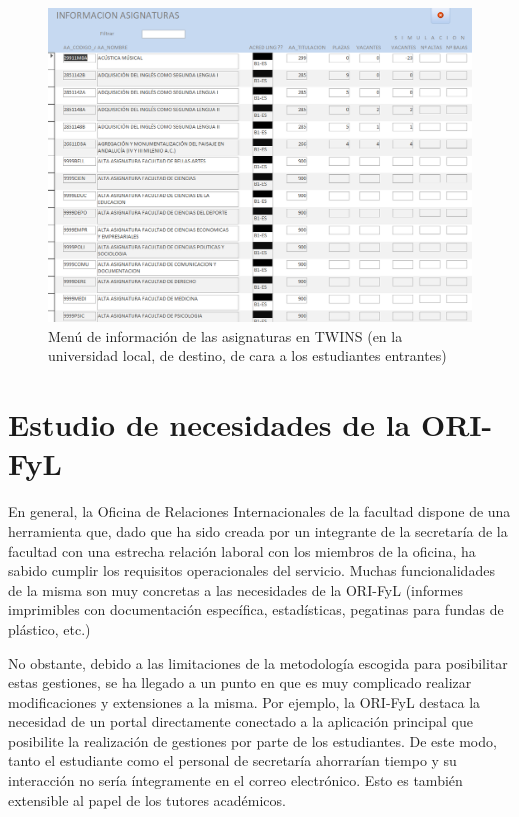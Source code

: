 \begin{figure}
	\includegraphics[width=\textwidth]{img/Capturas de TWINS/infoAsignaturas.png}
	\caption[Vista de información de asignaturas en TWINS]{Menú de información de las asignaturas en TWINS (en la universidad local, de destino, de cara a los estudiantes entrantes)}
	\label{fig:infoAsignaturas}
\end{figure}



\section{Estudio de necesidades de la ORI-FyL}

En general, la Oficina de Relaciones Internacionales de la facultad dispone de una herramienta que, dado que ha sido creada por un integrante de la secretaría de la facultad con una estrecha relación laboral con los miembros de la oficina, ha sabido cumplir los requisitos  operacionales del servicio. Muchas funcionalidades de la misma son muy concretas a las necesidades de la ORI-FyL (informes imprimibles con documentación específica, estadísticas, pegatinas para fundas de plástico, etc.)

No obstante, debido a las limitaciones de la metodología escogida para posibilitar estas gestiones, se ha llegado a un punto en que es muy complicado realizar modificaciones y extensiones a la misma. Por ejemplo, la ORI-FyL destaca la necesidad de un portal directamente conectado a la aplicación principal que posibilite la realización de gestiones por parte de los estudiantes. De este modo, tanto el estudiante como el personal de secretaría ahorrarían tiempo y su interacción no sería íntegramente en el correo electrónico. Esto es también extensible al papel de los tutores académicos.

